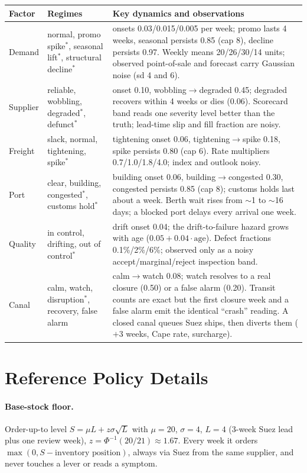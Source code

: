 \documentclass{article}
\begin{document}
\begin{center}
\small
\begin{tabular}{lp{4.6cm}p{6.2cm}}
\toprule
Factor & Regimes & Key dynamics and observations \\
\midrule
Demand & normal, promo spike$^{*}$, seasonal lift$^{*}$, structural decline$^{*}$ &
onsets 0.03/0.015/0.005 per week; promo lasts 4 weeks, seasonal persists 0.85
(cap 8), decline persists 0.97. Weekly means 20/26/30/14 units; observed
point-of-sale and forecast carry Gaussian noise (sd 4 and 6). \\
Supplier & reliable, wobbling, degraded$^{*}$, defunct$^{*}$ &
onset 0.10, wobbling$\to$degraded 0.45; degraded recovers within 4 weeks or
dies (0.06). Scorecard band reads one severity level better than the truth;
lead-time slip and fill fraction are noisy. \\
Freight & slack, normal, tightening, spike$^{*}$ &
tightening onset 0.06, tightening$\to$spike 0.18, spike persists 0.80 (cap
6). Rate multipliers 0.7/1.0/1.8/4.0; index and outlook noisy. \\
Port & clear, building, congested$^{*}$, customs hold$^{*}$ &
building onset 0.06, building$\to$congested 0.30, congested persists 0.85
(cap 8); customs holds last about a week. Berth wait rises from $\sim$1 to
$\sim$16 days; a blocked port delays every arrival one week. \\
Quality & in control, drifting, out of control$^{*}$ &
drift onset 0.04; the drift-to-failure hazard grows with age
($0.05 + 0.04 \cdot \text{age}$). Defect fractions 0.1\%/2\%/6\%; observed
only as a noisy accept/marginal/reject inspection band. \\
Canal & calm, watch, disruption$^{*}$, recovery, false alarm &
calm$\to$watch 0.08; watch resolves to a real closure (0.50) or a false
alarm (0.20). Transit counts are exact but the first closure week and a
false alarm emit the identical ``crash'' reading. A closed canal queues
Suez ships, then diverts them ($+$3 weeks, Cape rate, surcharge). \\
\bottomrule
\end{tabular}
\end{center}

\section{Reference Policy Details}
\label{app:oracle}

\paragraph{Base-stock floor.} Order-up-to level
$S = \mu L + z\sigma\sqrt{L}$ with $\mu = 20$, $\sigma = 4$, $L = 4$ (3-week
Suez lead plus one review week), $z = \Phi^{-1}(20/21) \approx 1.67$. Every
week it orders $\max(0, S - \text{inventory position})$, always via Suez
from the same supplier, and never touches a lever or reads a symptom.
\end{document}
